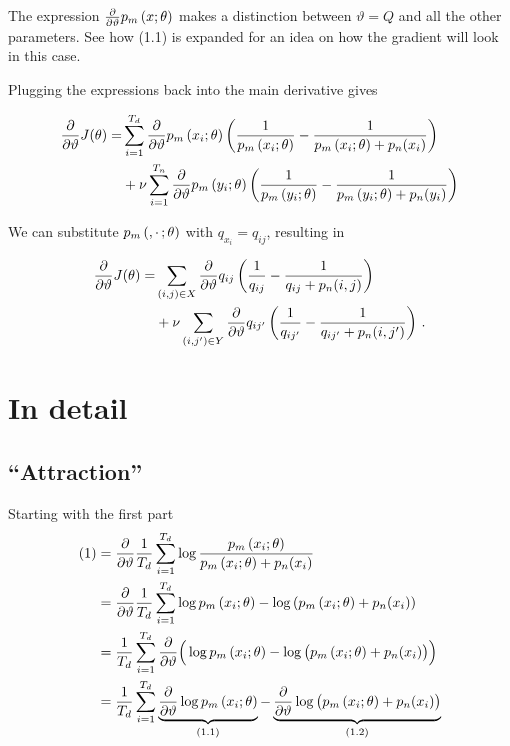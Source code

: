 \documentclass[a4paper,12pt]{article}
\newcommand{\pmodel}[1]{\ensuremath p_m\left(#1; \theta\right)}
\newcommand{\pnoise}[1]{\ensuremath p_n(#1)}
\newcommand{\dtheta}{\ensuremath \frac{\partial}{\partial\vartheta}}
\begin{document}
The expression $\dtheta \pmodel{x}$ makes a distinction between
$\vartheta = Q$ and all the other parameters. See how (1.1) is
expanded for an idea on how the gradient will look in this case.

Plugging the expressions back into the main derivative gives

\begin{align*}
  \dtheta J(\theta) = &\sum_{i=1}^{T_d} \dtheta\pmodel{x_i} \left(  \frac{1}{\pmodel{x_i}} - \frac{1}{\pmodel{x_i} + \pnoise{x_i}}\right) \\
                      &+ \nu \sum_{i=1}^{T_n} \dtheta\pmodel{y_i} \left(  \frac{1}{\pmodel{y_i}} - \frac{1}{\pmodel{y_i} + \pnoise{y_i}}\right)
\end{align*}

We can substitute $\pmodel{,\cdot\,}$ with $q_{x_i} = q_{ij}$, resulting in

\begin{align*}
  \dtheta J(\theta) = &\sum_{(i,j)\in X} \dtheta q_{ij} \left(  \frac{1}{q_{ij}} - \frac{1}{q_{ij} + \pnoise{i, j}}\right) \\
                      &+ \nu \sum_{(i,j')\in Y} \dtheta q_{ij'} \left(  \frac{1}{q_{ij'}} - \frac{1}{q_{ij'} + \pnoise{i,j'}}\right)\,.
\end{align*}



\section*{In detail}

\subsection*{“Attraction”}
Starting with the first part
\begin{align*}
  (1) &= \dtheta\frac{1}{T_d} \sum_{i=1}^{T_d} \log \frac{\pmodel{x_i}}{\pmodel{x_i} + \pnoise{x_i}} \\
      &= \dtheta\frac{1}{T_d} \sum_{i=1}^{T_d} \log {\pmodel{x_i}} - \log \left(\pmodel{x_i} + \pnoise{x_i}\right) \\
      &= \frac{1}{T_d} \sum_{i=1}^{T_d} \dtheta\Big(  \log {\pmodel{x_i}} - \log \big(\pmodel{x_i} + \pnoise{x_i}\big)\Big) \\
      &= \frac{1}{T_d} \sum_{i=1}^{T_d} \underbrace{\dtheta \log {\pmodel{x_i}}}_{(1.1)} - \underbrace{\dtheta\log \big(\pmodel{x_i} + \pnoise{x_i}\big)}_{(1.2)} \\
\end{align*}
\end{document}
